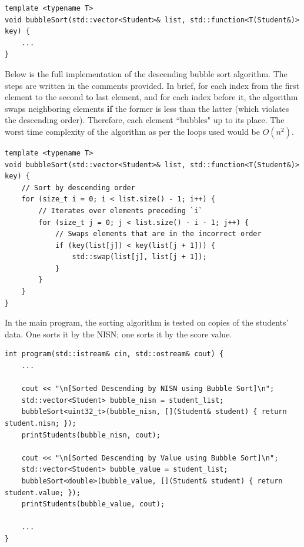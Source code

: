 \documentclass[12pt]{article}
\begin{document}
\begin{verbatim}
template <typename T>
void bubbleSort(std::vector<Student>& list, std::function<T(Student&)> key) {
    ...
}
\end{verbatim}

Below is the full implementation of the descending bubble sort algorithm. The steps are written in the comments provided. In brief, for each index from the first element to the second to last element, and for each index before it, the algorithm swaps neighboring elements \textbf{if} the former is less than the latter (which violates the descending order). Therefore, each element ``bubbles" up to its place. The worst time complexity of the algorithm as per the loops used would be $O(n^2)$.

\begin{verbatim}
template <typename T>
void bubbleSort(std::vector<Student>& list, std::function<T(Student&)> key) {
    // Sort by descending order
    for (size_t i = 0; i < list.size() - 1; i++) {
        // Iterates over elements preceding `i`
        for (size_t j = 0; j < list.size() - i - 1; j++) {
            // Swaps elements that are in the incorrect order
            if (key(list[j]) < key(list[j + 1])) {
                std::swap(list[j], list[j + 1]);
            }
        }
    }
}
\end{verbatim}

In the main program, the sorting algorithm is tested on copies of the students' data. One sorts it by the NISN; one sorts it by the score value.

\begin{verbatim}
int program(std::istream& cin, std::ostream& cout) {
    ...

    cout << "\n[Sorted Descending by NISN using Bubble Sort]\n";
    std::vector<Student> bubble_nisn = student_list;
    bubbleSort<uint32_t>(bubble_nisn, [](Student& student) { return student.nisn; });
    printStudents(bubble_nisn, cout);

    cout << "\n[Sorted Descending by Value using Bubble Sort]\n";
    std::vector<Student> bubble_value = student_list;
    bubbleSort<double>(bubble_value, [](Student& student) { return student.value; });
    printStudents(bubble_value, cout);

    ...
}
\end{verbatim}
\end{document}
